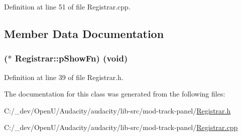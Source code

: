Definition at line 51 of file Registrar.\+cpp.



\subsection{Member Data Documentation}
\subsubsection[{\texorpdfstring{p\+Show\+Fn}{pShowFn}}]{($\ast$ Registrar\+::p\+Show\+Fn) ({\bf void})}\hypertarget{class_registrar_a856850ae295c67f7c3a22307b9d51009}{}\label{class_registrar_a856850ae295c67f7c3a22307b9d51009}


Definition at line 39 of file Registrar.\+h.



The documentation for this class was generated from the following files\+:\begin{DoxyCompactItemize}
\item 
C\+:/\+\_\+dev/\+Open\+U/\+Audacity/audacity/lib-\/src/mod-\/track-\/panel/\hyperlink{_registrar_8h}{Registrar.\+h}\item 
C\+:/\+\_\+dev/\+Open\+U/\+Audacity/audacity/lib-\/src/mod-\/track-\/panel/\hyperlink{_registrar_8cpp}{Registrar.\+cpp}\end{DoxyCompactItemize}
